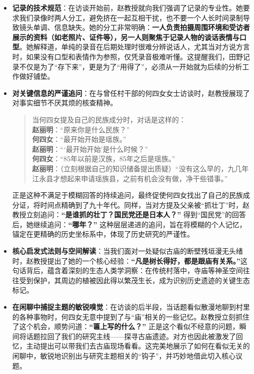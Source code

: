 \documentclass[UTF8]{ctexart}
\begin{document}
\begin{itemize}
    \item \textbf{记录的技术规范}：在访谈开始前，赵教授就向我们强调了记录的专业性。她要求我们录像时两人分工，避免挤在一起互相干扰，也不要一个人长时间录制导致镜头单调、信息缺失。她的分工非常明确：\textbf{一人负责拍摄周围环境和受访者展示的资料（如老照片、证件等），另一人则聚焦于记录人物的谈话表情与口型}。她解释道，单纯的录音在后期处理时很难分辨说话人，尤其当对方说方言时，如果没有口型和表情作为参照，仅凭录音极难听懂。这提醒我们，田野记录不仅是为了“存下来”，更是为了“用得了”，必须从一开始就为后续的分析工作做好铺垫。

    \item \textbf{对关键信息的严谨追问}：在与曾任村干部的何四女女士访谈时，赵教授展现了对事实细节不厌其烦的核查精神。
    
    \begin{quote}
        当何四女提及自己的民族成分时，对话是这样的：\\
        \textbf{赵丽明}：“原来你是什么民族？”\\
        \textbf{何四女}：“最开始开始是瑶族。”\\
        \textbf{赵丽明}：“‘最开始开始’是什么时候？”\\
        \textbf{何四女}：“85年以前是汉族，85年之后是瑶族。”\\
        \textbf{赵丽明}：（立刻根据自己的知识储备提出质疑）“没有这么早的，九几年江永县才想起来申请瑶族县，之前有机会没有做，净干些错事。”
    \end{quote}
    
    正是这种不满足于模糊回答的持续追问，最终促使何四女找出了自己的民族成分证，将时间点精确到了九十年代。同样，当对方提及父亲被“抓壮丁”时，赵教授立刻追问：\textbf{“是谁抓的壮丁？国民党还是日本人？”} 得到“国民党”的回答后，她继续追问：\textbf{“哪年？”} 这种层层递进的追问，旨在将模糊的个人记忆，锚定在更精确的历史坐标系中，体现了历史研究的严谨性。

    \item \textbf{核心启发式法则与空间解读}：当我们面对一处疑似古庙的断壁残垣漫无头绪时，赵教授提出了她的一个核心经验：\textbf{“凡是树长得好，都是跟庙有关系。”}这句话背后，蕴含着深刻的生态人类学洞察：在传统村落中，寺庙等神圣空间往往受到保护，其周边的植被因此得以繁茂生长，成为识别历史遗迹的关键生态标记。

    \item \textbf{在闲聊中捕捉主题的敏锐嗅觉}：在访谈的后半段，当话题看似散漫地聊到村里的各种事物时，何四女无意中提到了与“庙”相关的一些记忆。赵教授立刻抓住了这个机会，顺势问道：\textbf{“匾上写的什么？”} 正是这个看似不经意的问题，瞬间将话题拉回了我们的研究主线——探寻古庙遗迹。对方也因此被激发了回忆，主动提出可以带我们去古庙现场看看。这完美地展示了如何在看似无关的闲聊中，敏锐地识别出与研究主题相关的“钩子”，并巧妙地借此切入核心议题。
\end{itemize}
\end{document}
